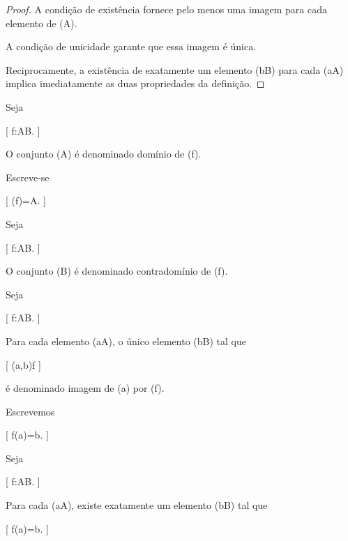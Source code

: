 \documentclass[../../main]{subfiles}
\begin{document}
\begin{proof}

	A condição de existência fornece pelo menos uma
	imagem para cada elemento de (A).

	A condição de unicidade garante que essa imagem é
	única.

	Reciprocamente, a existência de exatamente um
	elemento (b\in B) para cada (a\in A)
	implica imediatamente as duas propriedades da
	definição.

\end{proof}

\begin{defn}[Domínio]
	\label{def:matematica:funcoes:fundamentos:dominio}

	Seja

		[
			f:A\to B.
		]

	O conjunto (A) é denominado domínio de (f).

	Escreve-se

	[
	(f)=A.
	]

\end{defn}

\begin{defn}[Contradomínio]
	\label{def:matematica:funcoes:fundamentos:contradominio}

	Seja

		[
			f:A\to B.
		]

	O conjunto (B) é denominado contradomínio de
	(f).

\end{defn}

\begin{defn}
	\label{def:matematica:funcoes:fundamentos:imagem-elemento}

	Seja

		[
			f:A\to B.
		]

	Para cada elemento (a\in A), o único elemento
	(b\in B) tal que

		[
			(a,b)\in f
		]

	é denominado imagem de (a) por (f).

	Escrevemos

		[
			f(a)=b.
		]

\end{defn}

\begin{prop}
	\label{prop:matematica:funcoes:fundamentos:unicidade-imagem}

	Seja

		[
			f:A\to B.
		]

	Para cada (a\in A), existe exatamente um
	elemento (b\in B) tal que

		[
			f(a)=b.
		]

\end{prop}
\end{document}
